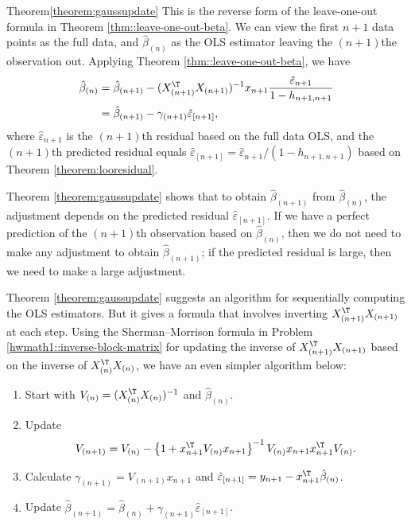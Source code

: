 \begin{myproof}{Theorem}{\ref{theorem:gaussupdate}}
This is the reverse form of the leave-one-out formula in Theorem \ref{thm::leave-one-out-beta}. We can view
the first $n+1$ data points as the full data, and $\hat{\beta}_{(n)}$
as the OLS estimator leaving the $(n+1)$the observation out.
Applying Theorem \ref{thm::leave-one-out-beta}, we have 
\begin{align*}
\hat{\beta}_{(n)} & =\hat{\beta}_{(n+1)}-(X_{(n+1)}^{\T}X_{(n+1)})^{-1}x_{n+1}\frac{\hat{\varepsilon}_{n+1}}{1-h_{n+1,n+1}}\\
 & =\hat{\beta}_{(n+1)}-\gamma_{(n+1)}\hat{\varepsilon}_{[n+1]},
\end{align*}
where $\hat{\varepsilon}_{n+1}$ is the $(n+1)$th residual based
on the full data OLS, and the $(n+1)$th predicted residual equals
$\hat{\varepsilon}_{[n+1]}=\hat{\varepsilon}_{n+1}/(1-h_{n+1,n+1})$
based on Theorem \ref{theorem:looresidual}.
\end{myproof}



Theorem \ref{theorem:gaussupdate} shows that to obtain $\hat{\beta}_{(n+1)}$
from $\hat{\beta}_{(n)}$, the adjustment depends on the predicted
residual $\hat{\varepsilon}_{[n+1]}$. If we have a perfect prediction
of the $(n+1)$th observation based on $\hat{\beta}_{(n)}$, then
we do not need to make any adjustment to obtain $\hat{\beta}_{(n+1)}$;
if the predicted residual is large, then we need to make a large
adjustment. 

Theorem \ref{theorem:gaussupdate} suggests an algorithm for sequentially
computing the OLS estimators. But it gives a formula that involves inverting $X_{(n+1)}^{\T}X_{(n+1)}$ at each step.
Using the Sherman--Morrison formula in Problem \ref{hwmath1::inverse-block-matrix}
for updating the inverse of $X_{(n+1)}^{\T}X_{(n+1)}$ based on the
inverse of $X_{(n)}^{\T}X_{(n)}$, we have an even simpler algorithm
below:
\begin{enumerate}[label=(G\arabic*), ref=G\arabic*]
\item\label{alg::gaussupdate1} Start with $V_{(n)}=(X_{(n)}^{\T}X_{(n)})^{-1}$ and $\hat{\beta}_{(n)}$.
\item Update 
\[
V_{(n+1)}=V_{(n)}-\left\{ 1+x_{n+1}^{\T}V_{(n)}x_{n+1}\right\} ^{-1}V_{(n)}x_{n+1}x_{n+1}^{\T}V_{(n)}.
\]
\item Calculate $\gamma_{(n+1)}=V_{(n+1)}x_{n+1}$ and $\hat{\varepsilon}_{[n+1]}=y_{n+1}-x_{n+1}^{\T}\hat{\beta}_{(n)}$.
\item\label{alg::gaussupdate4} Update $\hat{\beta}_{(n+1)}=\hat{\beta}_{(n)}+\gamma_{(n+1)}\hat{\varepsilon}_{[n+1]}$. 
\end{enumerate}
%



